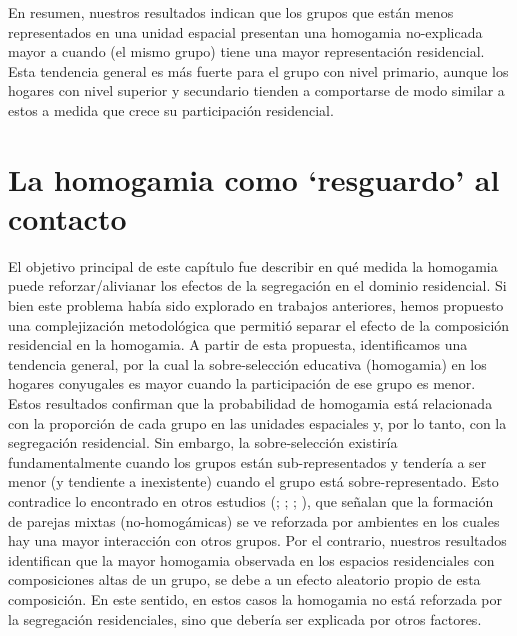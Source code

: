 \documentclass[
  spanish,
  a4paper,%
  chapterprefix=true,%
  DIV=calc,%
  twoside]{scrbook}%
\begin{document}
En resumen, nuestros resultados indican que los grupos que están menos
representados en una unidad espacial presentan una homogamia
no-explicada mayor a cuando (el mismo grupo) tiene una mayor
representación residencial. Esta tendencia general es más fuerte para el
grupo con nivel primario, aunque los hogares con nivel superior y
secundario tienden a comportarse de modo similar a estos a medida que
crece su participación residencial.

\section{La homogamia como `resguardo' al contacto}\label{homogamy-conclussion}

El objetivo principal de este capítulo fue describir en qué medida la
homogamia puede reforzar/alivianar los efectos de la segregación en el
dominio residencial. Si bien este problema había sido explorado en
trabajos anteriores, hemos propuesto una complejización metodológica que
permitió separar el efecto de la composición residencial en la
homogamia. A partir de esta propuesta, identificamos una tendencia
general, por la cual la sobre-selección educativa (homogamia) en los
hogares conyugales es mayor cuando la participación de ese grupo es
menor. Estos resultados confirman que la probabilidad de homogamia está
relacionada con la proporción de cada grupo en las unidades espaciales
y, por lo tanto, con la segregación residencial. Sin embargo, la
sobre-selección existiría fundamentalmente cuando los grupos están
sub-representados y tendería a ser menor (y tendiente a inexistente)
cuando el grupo está sobre-representado. Esto contradice lo encontrado
en otros estudios (; ; ; ),
que señalan que la formación de parejas mixtas (no-homogámicas) se ve
reforzada por ambientes en los cuales hay una mayor interacción con
otros grupos. Por el contrario, nuestros resultados identifican que la
mayor homogamia observada en los espacios residenciales con
composiciones altas de un grupo, se debe a un efecto aleatorio propio de
esta composición. En este sentido, en estos casos la homogamia no está
reforzada por la segregación residenciales, sino que debería ser
explicada por otros factores.
\end{document}
